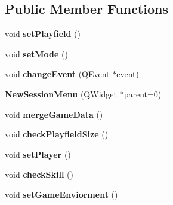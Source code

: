\subsection*{Public Member Functions}
\begin{DoxyCompactItemize}
\item 
\hypertarget{classNewSessionMenu_a4742167534b8efad3a8163ac3d243b1b}{void {\bfseries set\-Playfield} ()}\label{classNewSessionMenu_a4742167534b8efad3a8163ac3d243b1b}

\item 
\hypertarget{classNewSessionMenu_afae85196d39cd5b68e445659faf3f901}{void {\bfseries set\-Mode} ()}\label{classNewSessionMenu_afae85196d39cd5b68e445659faf3f901}

\item 
\hypertarget{classNewSessionMenu_abe4916445e5ce3edfe78adb89533f230}{void {\bfseries change\-Event} (Q\-Event $\ast$event)}\label{classNewSessionMenu_abe4916445e5ce3edfe78adb89533f230}

\item 
\hypertarget{classNewSessionMenu_ae1038e3894d95dd28e7e9bde54fdc5eb}{{\bfseries New\-Session\-Menu} (Q\-Widget $\ast$parent=0)}\label{classNewSessionMenu_ae1038e3894d95dd28e7e9bde54fdc5eb}

\item 
\hypertarget{classNewSessionMenu_a3a5d3b6d5f3039c7ff2e4933bde10a70}{void {\bfseries merge\-Game\-Data} ()}\label{classNewSessionMenu_a3a5d3b6d5f3039c7ff2e4933bde10a70}

\item 
\hypertarget{classNewSessionMenu_a51512ad474fdb0eb6b880d17a5ce4d11}{void {\bfseries check\-Playfield\-Size} ()}\label{classNewSessionMenu_a51512ad474fdb0eb6b880d17a5ce4d11}

\item 
\hypertarget{classNewSessionMenu_ac13a0674e7492b42279b60e8b73fb561}{void {\bfseries set\-Player} ()}\label{classNewSessionMenu_ac13a0674e7492b42279b60e8b73fb561}

\item 
\hypertarget{classNewSessionMenu_a0985b4cc0908c662788f68dd55b38472}{void {\bfseries check\-Skill} ()}\label{classNewSessionMenu_a0985b4cc0908c662788f68dd55b38472}

\item 
\hypertarget{classNewSessionMenu_a30076610330be4a709eb9c72b3ec9c30}{void {\bfseries set\-Game\-Enviorment} ()}\label{classNewSessionMenu_a30076610330be4a709eb9c72b3ec9c30}

\end{DoxyCompactItemize}
